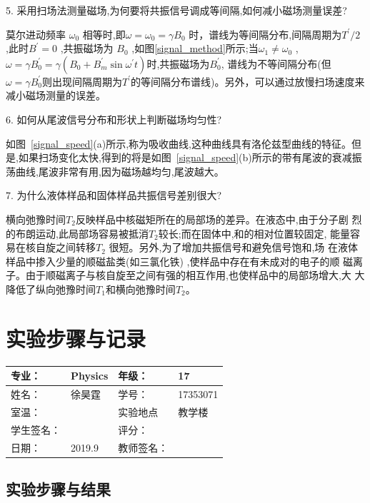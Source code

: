 \documentclass{ctexart}
\begin{document}
5. 采用扫场法测量磁场,为何要将共振信号调成等间隔,如何减小磁场测量误差?

莫尔进动频率 $\omega_0$ 相等时,即$\omega = \omega_0 =\gamma B_0$ 时，谱线为等间隔分布,间隔周期为$T^{\prime}/2$ ,此时$B^{\prime}= 0$ ,共振磁场为 $B_0$ ,如图\ref{signal_method}所示;当$\omega_1 \ne \omega_0$ , $\omega = \gamma B_0^{\prime} = \gamma(B_0 + B_m^{\prime}\sin\omega^{\prime} t)$时,共振磁场为$B_0^{\prime}$, 谱线为不等间隔分布(但$\omega = \gamma B_0^{\prime}$则出现间隔周期为$T^{\prime}$的等间隔分布谱线)。另外，可以通过放慢扫场速度来减小磁场测量的误差。

6. 如何从尾波信号分布和形状上判断磁场均匀性?

如图~\ref{signal_speed}(a)所示,称为吸收曲线,这种曲线具有洛伦兹型曲线的特征。但是,如果扫场变化太快,得到的将是如图~\ref{signal_speed}(b)所示的带有尾波的衰减振荡曲线,尾波非常有用,因为磁场越均匀,尾波越大。

7. 为什么液体样品和固体样品共振信号差别很大?

横向弛豫时间$T_2$反映样品中核磁矩所在的局部场的差异。在液态中,由于分子剧
烈的布朗运动,此局部场容易被抵消$T_2$较长;而在固体中,和的相对位置较固定,
能量容易在核自旋之间转移$T_2$ 很短。另外,为了增加共振信号和避免信号饱和,场
在液体样品中掺入少量的顺磁盐类(如三氯化铁)
,使样品中存在有未成对的电子的顺
磁离子。由于顺磁离子与核自旋至之间有强的相互作用,也使样品中的局部场增大,大
大降低了纵向弛豫时间$T_1$和横向弛豫时间$T_2$。
\newpage
\section{实验步骤与记录}
\begin{tabular}{|p{8em}|p{8em}|p{8em}|p{8em}|}
	\hline 
	专业：     &Physics       &年级：      & 17     \\
	\hline
	姓名：& 徐昊霆 &学号：&17353071  \\
	\hline
	室温：&                    &实验地点 & 教学楼 \\
	\hline	
	学生签名： & & 评分： & \\
	\hline
	日期： & 2019.9 & 教师签名：&  \\
	\hline
\end{tabular}
	\subsection{实验步骤与结果}
\end{document}
